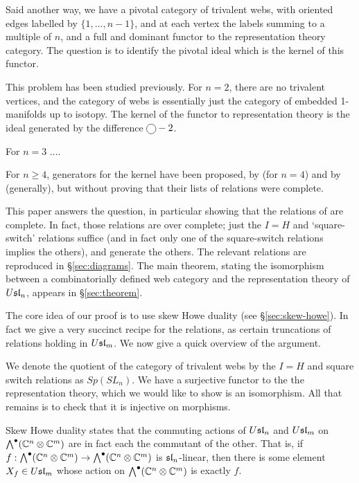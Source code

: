 \documentclass[11pt,leqno]{article}
\begin{document}
Said another way, we have a pivotal category of trivalent webs, with oriented edges labelled by $\{1, \ldots, n-1\}$, and at each vertex the labels summing to a multiple of $n$, and a full and dominant functor to the representation theory category. The question is to identify the pivotal ideal which is the kernel of this functor.

This problem has been studied previously. For $n=2$, there are no trivalent vertices, and the category of webs is essentially just the category of embedded 1-manifolds up to isotopy. The kernel of the functor to representation theory is the ideal generated by the difference $\tikz[baseline=-2pt]{\node[draw,circle] {};} - 2$. 

For $n=3$ .... 

For $n \geq 4$, generators for the kernel have been proposed, by \cite{math.QA/0310143} (for $n=4$) and by \cite{0704.1503} (generally), but without proving that their lists of relations were complete.

This paper answers the question, in particular showing that the relations of \cite{0704.1503} are complete. In fact, those relations are over complete; just the $I=H$ and `square-switch' relations suffice (and in fact only one of the square-switch relations implies the others), and generate the others. The relevant relations are reproduced in \S\ref{sec:diagrams}.
The main theorem, stating the isomorphism between a combinatorially defined web category and the representation theory of $\Usl{n}$, appears in \S \ref{sec:theorem}.

The core idea of our proof is to use skew Howe duality (see \S \ref{sec:skew-howe}). In fact we give a very succinct recipe for the relations, as certain truncations of relations holding in $\Usl{m}$. We now give a quick overview of the argument.

We denote the quotient of the category of trivalent webs by the $I=H$ and square switch relations as $Sp(SL_n)$. We have a surjective functor to the the representation theory, which we would like to show is an isomorphism. All that remains is to check that it is injective on morphisms.

Skew Howe duality states that the commuting actions of $\Usl{n}$ and $\Usl{m}$ on $\Alt^\bullet(\mathbb{C}^n \tensor \mathbb{C}^m)$ are in fact each the commutant of the other. That is, if  $f: \Alt^\bullet(\mathbb{C}^n \tensor \mathbb{C}^m) \to \Alt^\bullet(\mathbb{C}^n \tensor \mathbb{C}^m)$ is $\sl{n}$-linear, then there is some element $X_f \in \Usl{m}$ whose action on  $\Alt^\bullet(\mathbb{C}^n \tensor \mathbb{C}^m)$ is exactly $f$.
\end{document}
